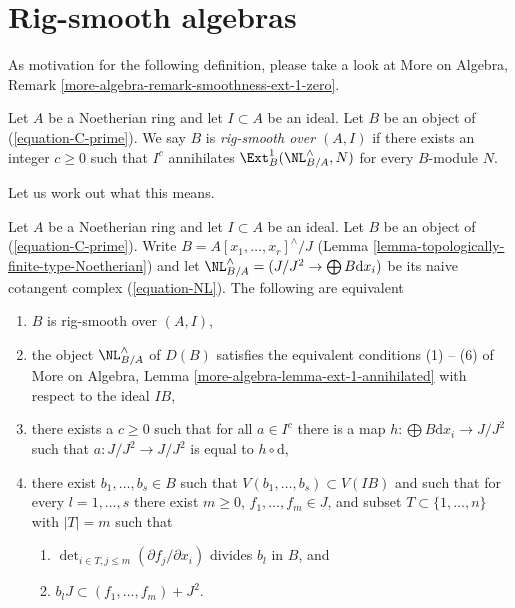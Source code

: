 \section{Rig-smooth algebras}
\label{section-rig-smooth}

\noindent
As motivation for the following definition, please take a look at
More on Algebra, Remark \ref{more-algebra-remark-smoothness-ext-1-zero}.

\begin{definition}
\label{definition-rig-smooth-homomorphism}
Let $A$ be a Noetherian ring and let $I \subset A$ be an ideal.
Let $B$ be an object of (\ref{equation-C-prime}). We say
$B$ is {\it rig-smooth over $(A, I)$} if there exists an integer $c \geq 0$
such that $I^c$ annihilates $\Ext^1_B(\NL_{B/A}^\wedge, N)$ for every
$B$-module $N$.
\end{definition}

\noindent
Let us work out what this means.

\begin{lemma}
\label{lemma-equivalent-with-artin-smooth}
Let $A$ be a Noetherian ring and let $I \subset A$ be an ideal.
Let $B$ be an object of (\ref{equation-C-prime}). Write
$B = A[x_1, \ldots, x_r]^\wedge/J$
(Lemma \ref{lemma-topologically-finite-type-Noetherian})
and let $\NL_{B/A}^\wedge = (J/J^2 \to \bigoplus B\text{d}x_i)$
be its naive cotangent complex (\ref{equation-NL}).
The following are equivalent
\begin{enumerate}
\item $B$ is rig-smooth over $(A, I)$,
\item the object $\NL_{B/A}^\wedge$ of $D(B)$ satisfies the equivalent
conditions (1) -- (6) of More on Algebra, Lemma
\ref{more-algebra-lemma-ext-1-annihilated} with respect to the ideal $IB$,
\item there exists a $c \geq 0$ such that for all $a \in I^c$
there is a map $h : \bigoplus B\text{d}x_i \to J/J^2$ such that
$a : J/J^2 \to J/J^2$ is equal to $h \circ \text{d}$,
\item there exist $b_1, \ldots, b_s \in B$ such that
$V(b_1, \ldots, b_s) \subset V(IB)$ and such that for every
$l = 1, \ldots, s$ there exist $m \geq 0$, $f_1, \ldots, f_m \in J$,
and subset $T \subset \{1, \ldots, n\}$ with $|T| = m$ such that
\begin{enumerate}
\item $\det_{i \in T, j \leq m}(\partial f_j/ \partial x_i)$
divides $b_l$ in $B$, and
\item $b_l J \subset (f_1, \ldots, f_m) + J^2$.
\end{enumerate}
\end{enumerate}
\end{lemma}

